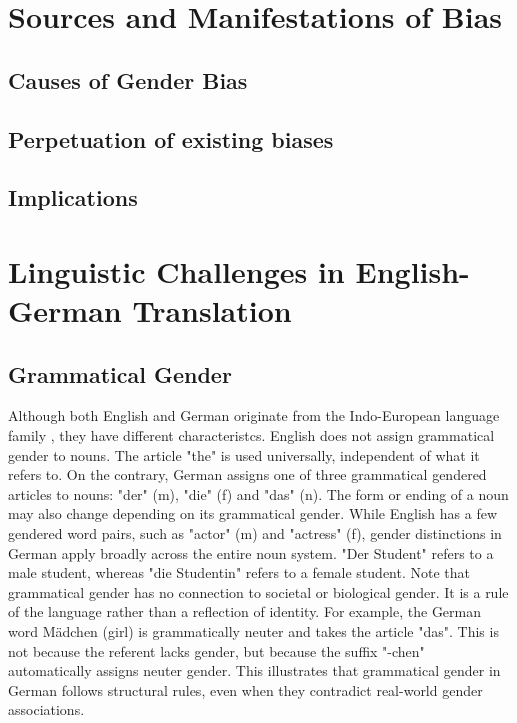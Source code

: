 \section{Sources and Manifestations of Bias}
\subsection{Causes of Gender Bias}


\subsection{Perpetuation of existing biases}


\subsection{Implications}

\section{Linguistic Challenges in English-German Translation}

\subsection{Grammatical Gender}
Although both English and German originate from the Indo-European language family \citep{baldiEnglishIndoEuropeanLanguage2008}, they have different characteristcs. English does not assign grammatical gender to nouns. The article "the" is used universally, independent of what it refers to. On the contrary, German assigns one of three grammatical gendered articles to nouns: "der" (m), "die" (f) and "das" (n). The form or ending of a noun may also change depending on its grammatical gender. While English has a few gendered word pairs, such as "actor" (m) and "actress" (f), gender distinctions in German apply broadly across the entire noun system. "Der Student" refers to a male student, whereas "die Studentin" refers to a female student. Note that grammatical gender has no connection to societal or biological gender. It is a rule of the language rather than a reflection of identity. For example, the German word Mädchen (girl) is grammatically neuter and takes the article "das". This is not because the referent lacks gender, but because the suffix "-chen" automatically assigns neuter gender. This illustrates that grammatical gender in German follows structural rules, even when they contradict real-world gender associations.


